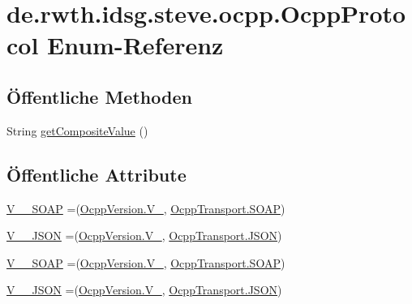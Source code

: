 \hypertarget{enumde_1_1rwth_1_1idsg_1_1steve_1_1ocpp_1_1_ocpp_protocol}{\section{de.\-rwth.\-idsg.\-steve.\-ocpp.\-Ocpp\-Protocol Enum-\/\-Referenz}
\label{enumde_1_1rwth_1_1idsg_1_1steve_1_1ocpp_1_1_ocpp_protocol}
}
\subsection*{Öffentliche Methoden}
\begin{DoxyCompactItemize}
\item 
String \hyperlink{enumde_1_1rwth_1_1idsg_1_1steve_1_1ocpp_1_1_ocpp_protocol_a95bc56bd40e0d2aa1935989a762e5501}{get\-Composite\-Value} ()
\end{DoxyCompactItemize}
\subsection*{Öffentliche Attribute}
\begin{DoxyCompactItemize}
\item 
\hyperlink{enumde_1_1rwth_1_1idsg_1_1steve_1_1ocpp_1_1_ocpp_protocol_a8d3c28a7f752ada8544f49a26fd75bf9}{V\-\_\-\_\-\-S\-O\-A\-P} =(\hyperlink{enumde_1_1rwth_1_1idsg_1_1steve_1_1ocpp_1_1_ocpp_version_a02a262b834136db4a30bb9a821c77574}{Ocpp\-Version.\-V\-\_}, \hyperlink{enumde_1_1rwth_1_1idsg_1_1steve_1_1ocpp_1_1_ocpp_transport_ae1fa7bdd519c49e7c5d175538ec2eb47}{Ocpp\-Transport.\-S\-O\-A\-P})
\item 
\hyperlink{enumde_1_1rwth_1_1idsg_1_1steve_1_1ocpp_1_1_ocpp_protocol_a0b890b1200cee602749371f323d0a686}{V\-\_\-\_\-\-J\-S\-O\-N} =(\hyperlink{enumde_1_1rwth_1_1idsg_1_1steve_1_1ocpp_1_1_ocpp_version_a02a262b834136db4a30bb9a821c77574}{Ocpp\-Version.\-V\-\_}, \hyperlink{enumde_1_1rwth_1_1idsg_1_1steve_1_1ocpp_1_1_ocpp_transport_aa9ac4184d327d7868285a13790f45cdc}{Ocpp\-Transport.\-J\-S\-O\-N})
\item 
\hyperlink{enumde_1_1rwth_1_1idsg_1_1steve_1_1ocpp_1_1_ocpp_protocol_a7476dab1a43648c24ed27bb7a6dc4cc1}{V\-\_\-\_\-\-S\-O\-A\-P} =(\hyperlink{enumde_1_1rwth_1_1idsg_1_1steve_1_1ocpp_1_1_ocpp_version_a73e998996dec6fa643fc3241249866d4}{Ocpp\-Version.\-V\-\_}, \hyperlink{enumde_1_1rwth_1_1idsg_1_1steve_1_1ocpp_1_1_ocpp_transport_ae1fa7bdd519c49e7c5d175538ec2eb47}{Ocpp\-Transport.\-S\-O\-A\-P})
\item 
\hyperlink{enumde_1_1rwth_1_1idsg_1_1steve_1_1ocpp_1_1_ocpp_protocol_a80b0fbd3a74af3443ec943f4e32fe7fa}{V\-\_\-\_\-\-J\-S\-O\-N} =(\hyperlink{enumde_1_1rwth_1_1idsg_1_1steve_1_1ocpp_1_1_ocpp_version_a73e998996dec6fa643fc3241249866d4}{Ocpp\-Version.\-V\-\_}, \hyperlink{enumde_1_1rwth_1_1idsg_1_1steve_1_1ocpp_1_1_ocpp_transport_aa9ac4184d327d7868285a13790f45cdc}{Ocpp\-Transport.\-J\-S\-O\-N})
\end{DoxyCompactItemize}


